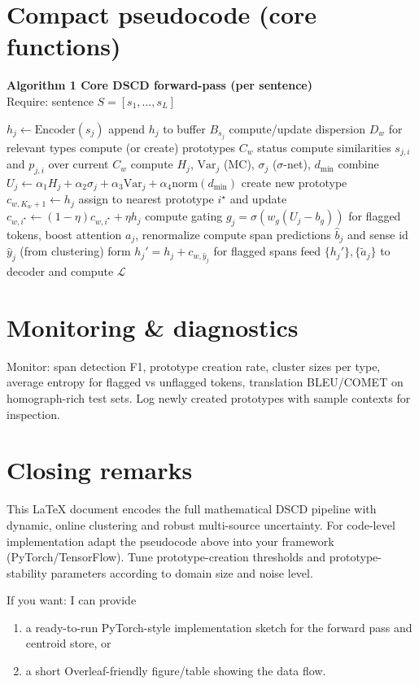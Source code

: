 \documentclass[a4paper,12pt]{article}
\begin{document}
\section*{Compact pseudocode (core functions)}

\noindent\textbf{Algorithm 1 Core DSCD forward-pass (per sentence)}\\
Require: sentence $S = [s_1, \ldots, s_L]$
\begin{algorithmic}[1]
    \STATE $h_j \leftarrow \text{Encoder}(s_j)$
    \STATE append $h_j$ to buffer $B_{s_j}$
\ENDFOR
\STATE compute/update dispersion $D_w$ for relevant types
    \STATE compute (or create) prototypes $C_w$ status
    \STATE compute similarities $s_{j,i}$ and $p_{j,i}$ over current $C_w$
    \STATE compute $H_j$, $\text{Var}_j$ (MC), $\sigma_j$ ($\sigma$-net), $d_{\min}$
    \STATE combine $U_j \leftarrow \alpha_1 H_j + \alpha_2 \sigma_j + \alpha_3 \text{Var}_j + \alpha_4 \text{norm}(d_{\min})$
        \STATE create new prototype $c_{w,K_w+1} \leftarrow h_j$
    \ELSE
        \STATE assign to nearest prototype $i^\star$ and update $c_{w,i^\star} \leftarrow (1-\eta) c_{w,i^\star} + \eta h_j$
    \ENDIF
\ENDFOR
\STATE compute gating $g_j = \sigma(w_g(U_j - b_g))$ for flagged tokens, boost attention $a_j$, renormalize
\STATE compute span predictions $\hat{b}_j$ and sense id $\hat{y}_j$ (from clustering)
\STATE form $h_j' = h_j + c_{w,\hat{y}_j}$ for flagged spans
\STATE feed $\{h_j'\}, \{\tilde{a}_j\}$ to decoder and compute $\mathcal{L}$
\end{algorithmic}

\section*{Monitoring \& diagnostics}
Monitor: span detection F1, prototype creation rate, cluster sizes per type, average entropy for flagged vs unflagged tokens, translation BLEU/COMET on homograph-rich test sets. Log newly created prototypes with sample contexts for inspection.

\section*{Closing remarks}
This LaTeX document encodes the full mathematical DSCD pipeline with dynamic, online clustering and robust multi-source uncertainty. For code-level implementation adapt the pseudocode above into your framework (PyTorch/TensorFlow). Tune prototype-creation thresholds and prototype-stability parameters according to domain size and noise level.

\bigskip

If you want: I can provide
\begin{enumerate}
    \item a ready-to-run PyTorch-style implementation sketch for the forward pass and centroid store, or
    \item a short Overleaf-friendly figure/table showing the data flow.
\end{enumerate}
\end{document}
